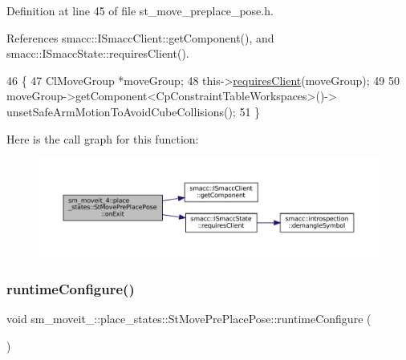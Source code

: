 Definition at line 45 of file st\+\_\+move\+\_\+preplace\+\_\+pose.\+h.



References smacc\+::\+I\+Smacc\+Client\+::get\+Component(), and smacc\+::\+I\+Smacc\+State\+::requires\+Client().


\begin{DoxyCode}
46             \{
47                 ClMoveGroup *moveGroup;
48                 this->\hyperlink{classsmacc_1_1ISmaccState_a7f95c9f0a6ea2d6f18d1aec0519de4ac}{requiresClient}(moveGroup);
49 
50                 moveGroup->getComponent<CpConstraintTableWorkspaces>()->
      unsetSafeArmMotionToAvoidCubeCollisions();
51             \}
\end{DoxyCode}
Here is the call graph for this function\+:
\nopagebreak
\begin{figure}[H]
\begin{center}
\leavevmode
\includegraphics[width=350pt]{structsm__moveit__4_1_1place__states_1_1StMovePrePlacePose_a4c62c5fdaa740b27f6af5c47d3507dad_cgraph}
\end{center}
\end{figure}
\mbox{\label{structsm__moveit__4_1_1place__states_1_1StMovePrePlacePose_a76aecb88d891dab05216eff868ee4ac7}} 
\subsubsection{\texorpdfstring{runtime\+Configure()}{runtimeConfigure()}}
{\footnotesize\ttfamily void sm\+\_\+moveit\+\_\+::place\+\_\+states\+::\+St\+Move\+Pre\+Place\+Pose\+::runtime\+Configure (\begin{DoxyParamCaption}{ }\end{DoxyParamCaption})\hspace{0.3cm}{\ttfamily [inline]}}



